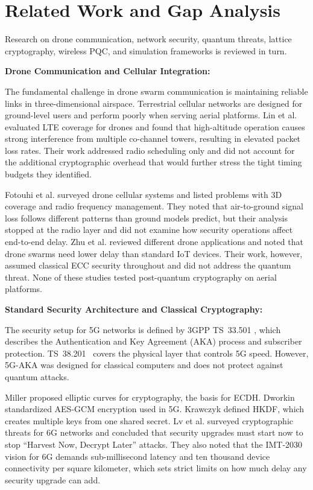 \documentclass{ieeeaccess}
\begin{document}
\section{Related Work and Gap Analysis}
\label{sec:relatedwork}

Research on drone communication, network security, quantum threats, lattice cryptography, wireless PQC, and simulation frameworks is reviewed in turn.

\noindent\textbf{Drone Communication and Cellular Integration:}

The fundamental challenge in drone swarm communication is maintaining reliable links in three-dimensional airspace. Terrestrial cellular networks are designed for ground-level users and perform poorly when serving aerial platforms. Lin et al. \cite{ref20} evaluated LTE coverage for drones and found that high-altitude operation causes strong interference from multiple co-channel towers, resulting in elevated packet loss rates. Their work addressed radio scheduling only and did not account for the additional cryptographic overhead that would further stress the tight timing budgets they identified.

Fotouhi et al. \cite{ref19} surveyed drone cellular systems and listed problems with 3D coverage and radio frequency management. They noted that air-to-ground signal loss follows different patterns than ground models predict, but their analysis stopped at the radio layer and did not examine how security operations affect end-to-end delay. Zhu et al. \cite{ref18} reviewed different drone applications and noted that drone swarms need lower delay than standard IoT devices. Their work, however, assumed classical ECC security throughout and did not address the quantum threat. None of these studies tested post-quantum cryptography on aerial platforms.

\vspace{2mm}\noindent\textbf{Standard Security Architecture and Classical Cryptography:}

The security setup for 5G networks is defined by 3GPP TS~33.501 \cite{ref16}, which describes the Authentication and Key Agreement (AKA) process and subscriber protection. TS~38.201~\cite{ref17} covers the physical layer that controls 5G speed. However, 5G-AKA was designed for classical computers and does not protect against quantum attacks.

Miller \cite{ref13} proposed elliptic curves for cryptography, the basis for ECDH. Dworkin \cite{ref15} standardized AES-GCM encryption used in 5G. Krawczyk \cite{ref14} defined HKDF, which creates multiple keys from one shared secret. Lv et al. \cite{ref21} surveyed cryptographic threats for 6G networks and concluded that security upgrades must start now to stop ``Harvest Now, Decrypt Later'' attacks. They also noted that the IMT-2030 vision for 6G demands sub-millisecond latency and ten thousand device connectivity per square kilometer, which sets strict limits on how much delay any security upgrade can add.
\end{document}
